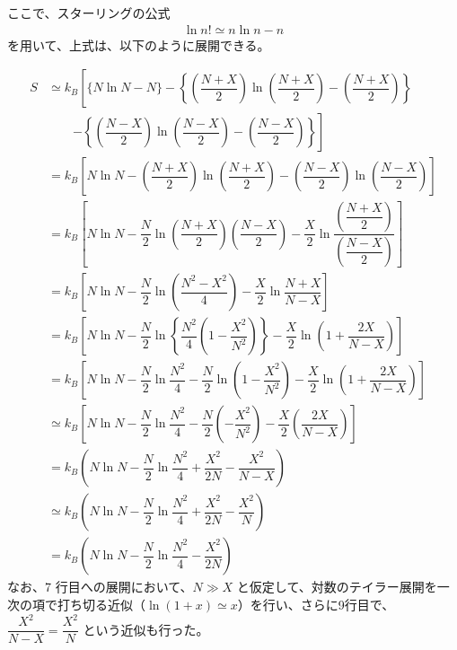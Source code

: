 \documentclass[uplatex,dvipdfmx,a4paper,11pt, titlepage]{jsarticle}
\begin{document}
\begin{appendix}
ここで、スターリングの公式
\begin{align*}
\ln n! \simeq n \ln n -n
\end{align*}
を用いて、上式は、以下のように展開できる。

\begin{align*}
S 
	&\simeq k_B \left[ \{ N\ln N - N \} - \left\{ \left( \dfrac{N+X}{2} \right)\ln \left( \dfrac{N+X}{2} \right) -\left( \dfrac{N+X}{2} \right) \right\} \right. \\
		&\quad \quad \left. - \left\{ \left( \dfrac{N-X}{2}\right) \ln \left( \dfrac{N-X}{2} \right) - \left( \dfrac{N-X}{2} \right) \right\} \right]\\
	&= k_B \left[ N\ln N - \left( \dfrac{N+X}{2} \right)\ln \left( \dfrac{N+X}{2}\right) - \left( \dfrac{N-X}{2} \right) \ln \left( \dfrac{N-X}{2} \right) \right]\\
	&= k_B \left[ N\ln N - \dfrac{N}{2} \ln \left( \dfrac{N+X}{2} \right)\left( \dfrac{N-X}{2} \right) 
		- \dfrac{X}{2} \ln \dfrac{\left( \dfrac{N+X}{2}\right)}{ \left( \dfrac{N-X}{2} \right) } \right]  \\
	&= k_B \left[ N\ln N - \dfrac{N}{2} \ln \left( \dfrac{N^2-X^2}{4} \right) - \dfrac{X}{2} \ln \dfrac{N + X}{ N - X } \right]  \\
	&= k_B \left[ N\ln N - \dfrac{N}{2} \ln \left\{ \dfrac{N^2}{4}\left(1-\dfrac{X^2}{N^2} \right) \right\} 
	- \dfrac{X}{2} \ln \left( 1 + \dfrac{2X}{N-X} \right) \right]  \\
	&= k_B \left[ N\ln N - \dfrac{N}{2} \ln \dfrac{N^2}{4} - \dfrac{N}{2} \ln \left(1-\dfrac{X^2}{N^2} \right) 
	- \dfrac{X}{2} \ln \left( 1 + \dfrac{2X}{N-X} \right) \right]  \\
	&\simeq k_B \left[ N\ln N - \dfrac{N}{2} \ln \dfrac{N^2}{4} - \dfrac{N}{2}\left(-\dfrac{X^2}{N^2} \right) 
	- \dfrac{X}{2} \left(\dfrac{2X}{N-X} \right) \right]  \\
	&= k_B \left( N\ln N - \dfrac{N}{2} \ln \dfrac{N^2}{4} + \dfrac{X^2}{2N} -\dfrac{X^2}{N - X} \right) \\
	&\simeq k_B \left( N\ln N - \dfrac{N}{2} \ln \dfrac{N^2}{4} + \dfrac{X^2}{2N} -\dfrac{X^2}{N} \right) \\
	&= k_B \left( N\ln N - \dfrac{N}{2} \ln \dfrac{N^2}{4} - \dfrac{X^2}{2N} \right)
\end{align*}
なお、7 行目への展開において、$N \gg X$ と仮定して、対数のテイラー展開を一次の項で打ち切る近似（$\ln(1+x) \simeq x$）を行い、さらに9行目で、$\dfrac{X^2}{N-X} = \dfrac{X^2}{N}$ という近似も行った。


\end{appendix}
\end{document}
